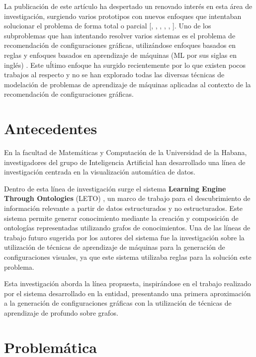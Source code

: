 La publicaci\'on de este art\'iculo ha despertado un renovado inter\'es en esta \'area de
investigaci\'on, surgiendo varios prototipos con nuevos enfoques que intentaban solucionar
el problema de forma total o parcial 
[\cite*{luo2018deepeye}, \cite*{moritz2018draco}, \cite*{dibia2019data2vis}, \cite*{hu2019vizml}, \cite*{li2021kg4vis}, \cite*{harris2021insight}].
Uno de los subproblemas que han intentando resolver varios sistemas es el problema
de recomendaci\'on de configuraciones gr\'aficas, utiliz\'andose enfoques
basados en reglas y enfoques basados en aprendizaje de m\'aquinas (ML por sus siglas en ingl\'es) \cite{zeng2021we}. 
Este u\'ltimo enfoque ha surgido recientemente por lo que existen pocos trabajos al
respecto y no se han explorado todas las diversas t\'ecnicas de modelaci\'on de problemas
de aprendizaje de m\'aquinas aplicadas al contexto de la recomendaci\'on de configuraciones gr\'aficas.


\section*{Antecedentes}
En la facultad de Matem\'aticas y Computaci\'on de la Universidad de la Habana,
investigadores del grupo de Inteligencia Artificial han desarrollado una l\'inea
de investigaci\'on centrada en la visualizaci\'on autom\'atica de datos.

Dentro de esta l\'inea de investigaci\'on surge el sistema \textbf{Learning Engine
Through Ontologies} (LETO) \cite{estevez2019demo}, un marco de trabajo para el descubrimiento
de informaci\'on relevante a partir de datos estructurados y no estructurados. Este
sistema permite generar conocimiento mediante la creaci\'on y composici\'on de ontolog\'ias 
representadas utilizando grafos de conocimientos. Una de las l\'ineas
de trabajo futuro sugerida por los autores del sistema fue la
investigaci\'on sobre la utilizaci\'on de t\'ecnicas
de aprendizaje de m\'aquinas para la generaci\'on de configuraciones visuales, ya que
este sistema utilizaba reglas para la soluci\'on este problema.

Esta investigaci\'on aborda la l\'inea propuesta, inspir\'andose en el trabajo realizado
por el sistema desarrollado en la entidad, presentando una primera aproximaci\'on a la generaci\'on 
de configuraciones gr\'aficas con la utilizaci\'on de t\'ecnicas de aprendizaje de profundo sobre grafos.


\section*{Problem\'atica}

